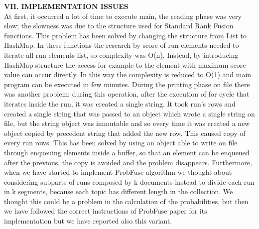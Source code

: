 \documentclass[12pt,journal]{IEEEtran}
\begin{document}
\textbf{VII. IMPLEMENTATION ISSUES} \\
At first, it occurred a lot of time to execute main, the reading phase was very slow; the slowness was due to the structure used for Standard Rank Fusion functions. This problem has been solved by changing the structure from List to HashMap. 
In these functions the research by score of run elements needed to iterate all run elements list, so complexity was O(n). Instead, by introducing HashMap structure the access for example to the element with maximum score value can occur directly. In this way the complexity is reduced to O(1) and main program can be executed in few minutes. 
During the printing phase on file there was another problem: during this operation, after the execution of for cycle that iterates inside the run, it was created a single string. It took run’s rows and created a single string that was passed to an object which wrote a single string on file, but the string object was immutable and so every time it was created a new object copied by precedent string that added the new row. This caused copy of every run rows. This has been solved by using an object able to write on file through enqueuing elements inside a buffer, so that an element can be enqueued after the previous, the copy is avoided and the problem disappears.
Furthermore, when we have started to implement ProbFuse algorithm we thought about considering subparts of runs composed by k documents instead to divide each run in k segments, because each topic has different length in the collection. We thought this could be a problem in the calculation of the probabilities, but then we have followed the correct instructions of ProbFuse paper for its implementation but we have reported also this variant. 
 \\
\end{document}
